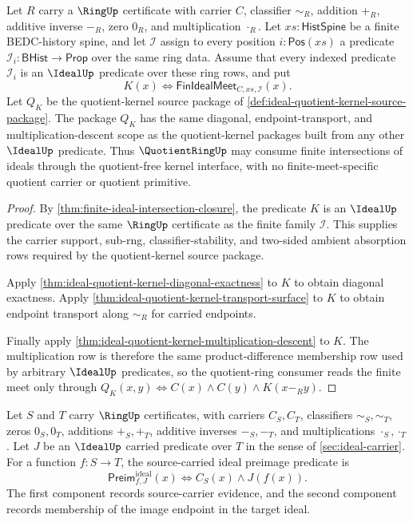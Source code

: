 \begin{theorem}
\label{thm:finite-ideal-meet-quotientring-kernel-scope}
Let $R$ carry a $\RingUp$ certificate with carrier $C$, classifier $\sim_R$, addition $+_R$, additive inverse $-_R$, zero $0_R$, and multiplication $\cdot_R$. Let $xs:\mathsf{HistSpine}$ be a finite BEDC-history spine, and let $\mathcal{I}$ assign to every position $i:\mathsf{Pos}(xs)$ a predicate $\mathcal{I}_i:\mathsf{BHist}\to\mathsf{Prop}$ over the same ring data. Assume that every indexed predicate $\mathcal{I}_i$ is an $\IdealUp$ predicate over these ring rows, and put
$$
K(x)\Longleftrightarrow \mathsf{FinIdealMeet}_{C,xs,\mathcal{I}}(x).
$$
Let $Q_K$ be the quotient-kernel source package of \autoref{def:ideal-quotient-kernel-source-package}. The package $Q_K$ has the same diagonal, endpoint-transport, and multiplication-descent scope as the quotient-kernel packages built from any other $\IdealUp$ predicate. Thus $\QuotientRingUp$ may consume finite intersections of ideals through the quotient-free kernel interface, with no finite-meet-specific quotient carrier or quotient primitive.
\end{theorem}
\begin{proof}
By \autoref{thm:finite-ideal-intersection-closure}, the predicate $K$ is an $\IdealUp$ predicate over the same $\RingUp$ certificate as the finite family $\mathcal{I}$. This supplies the carrier support, sub-rng, classifier-stability, and two-sided ambient absorption rows required by the quotient-kernel source package.

Apply \autoref{thm:ideal-quotient-kernel-diagonal-exactness} to $K$ to obtain diagonal exactness. Apply \autoref{thm:ideal-quotient-kernel-transport-surface} to $K$ to obtain endpoint transport along $\sim_R$ for carried endpoints.

Finally apply \autoref{thm:ideal-quotient-kernel-multiplication-descent} to $K$. The multiplication row is therefore the same product-difference membership row used by arbitrary $\IdealUp$ predicates, so the quotient-ring consumer reads the finite meet only through $Q_K(x,y)\Longleftrightarrow C(x)\land C(y)\land K(x-_R y)$.
\end{proof}

\begin{definition}
\label{def:ring-map-ideal-preimage-predicate}
Let $S$ and $T$ carry $\RingUp$ certificates, with carriers $C_S,C_T$, classifiers $\sim_S,\sim_T$, zeros $0_S,0_T$, additions $+_S,+_T$, additive inverses $-_S,-_T$, and multiplications $\cdot_S,\cdot_T$. Let $J$ be an $\IdealUp$ carried predicate over $T$ in the sense of \autoref{sec:ideal-carrier}. For a function $f:S\to T$, the source-carried ideal preimage predicate is
$$
\mathsf{Preim}^{\mathrm{ideal}}_{f,J}(x)\Longleftrightarrow C_S(x)\land J(f(x)).
$$
The first component records source-carrier evidence, and the second component records membership of the image endpoint in the target ideal.
\end{definition}

